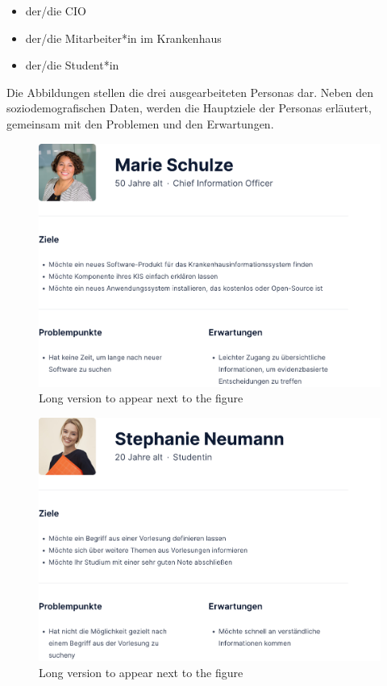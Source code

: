 \begin{itemize}
\item der/die \ac{CIO}
\item der/die Mitarbeiter*in im Krankenhaus
\item der/die Student*in
\end{itemize}

Die Abbildungen  stellen die drei ausgearbeiteten Personas dar.
Neben den soziodemografischen Daten, werden die Hauptziele der Personas erläutert, gemeinsam mit den Problemen und den Erwartungen.

\begin{figure}[H]
	\centering
    	\includegraphics[width=\textwidth]{Images/Persona_1}
   	\caption[Persona 1]{Long version to appear next to the figure}
   	\label{fig:persona1}
\end{figure}

\begin{figure}[H]
	\centering
    	\includegraphics[width=\textwidth]{Images/Persona_3}
   	\caption[Persona 2]{Long version to appear next to the figure}
   	\label{fig:persona2}
\end{figure}

